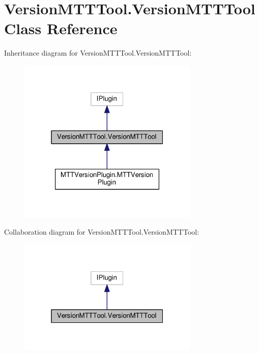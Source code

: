 \hypertarget{class_version_m_t_t_tool_1_1_version_m_t_t_tool}{\section{Version\-M\-T\-T\-Tool.\-Version\-M\-T\-T\-Tool Class Reference}
\label{class_version_m_t_t_tool_1_1_version_m_t_t_tool}
}


Inheritance diagram for Version\-M\-T\-T\-Tool.\-Version\-M\-T\-T\-Tool\-:
\nopagebreak
\begin{figure}[H]
\begin{center}
\leavevmode
\includegraphics[width=244pt]{class_version_m_t_t_tool_1_1_version_m_t_t_tool__inherit__graph}
\end{center}
\end{figure}


Collaboration diagram for Version\-M\-T\-T\-Tool.\-Version\-M\-T\-T\-Tool\-:
\nopagebreak
\begin{figure}[H]
\begin{center}
\leavevmode
\includegraphics[width=244pt]{class_version_m_t_t_tool_1_1_version_m_t_t_tool__coll__graph}
\end{center}
\end{figure}
